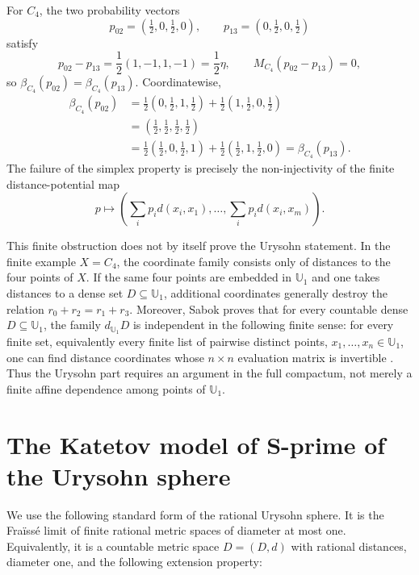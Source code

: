 \documentclass{proc-l}
\numberwithin{equation}{section}
\theoremstyle{definition}
\theoremstyle{remark}
\begin{document}
For \(C_4\), the two probability vectors
\[
        p_{02}=\left(\tfrac12,0,\tfrac12,0\right),
        \qquad
        p_{13}=\left(0,\tfrac12,0,\tfrac12\right)
\]
satisfy
\[
        p_{02}-p_{13}=\frac12(1,-1,1,-1)=\frac12\eta,
        \qquad
        M_{C_4}(p_{02}-p_{13})=0,
\]
so \(\beta_{C_4}(p_{02})=\beta_{C_4}(p_{13})\).  Coordinatewise,
\[
\begin{aligned}
        \beta_{C_4}(p_{02})
        &=\frac12(0,\tfrac12,1,\tfrac12)+\frac12(1,\tfrac12,0,\tfrac12)\\
        &=(\tfrac12,\tfrac12,\tfrac12,\tfrac12)\\
        &=\frac12(\tfrac12,0,\tfrac12,1)+\frac12(\tfrac12,1,\tfrac12,0)
        =\beta_{C_4}(p_{13}).
\end{aligned}
\]
The failure of the simplex property is precisely the non-injectivity of the
finite distance-potential map
\[
        p\longmapsto\left(\sum_i p_i d(x_i,x_1),\ldots,
        \sum_i p_i d(x_i,x_m)\right).
\]

This finite obstruction does not by itself prove the Urysohn statement.  In
the finite example \(X=C_4\), the coordinate family consists only of distances
to the four points of \(X\).  If the same four points are embedded in
\(\mathbb U_1\) and one takes distances to a dense set
\(D\subseteq\mathbb U_1\), additional coordinates generally destroy the
relation \(r_0+r_2=r_1+r_3\).  Moreover, Sabok proves that for every countable
dense \(D\subseteq\mathbb U_1\), the family \(d_{\mathbb U_1}D\) is independent
in the following finite sense: for every finite set, equivalently every finite
list of pairwise distinct points,
\(x_1,\ldots,x_n\in\mathbb U_1\), one can find distance coordinates whose
\(n\times n\) evaluation matrix is invertible \cite[Proposition 5.15]{Sabok2016}.
Thus the Urysohn part requires an argument in the full compactum, not merely a
finite affine dependence among points of \(\mathbb U_1\).

\section[The Katetov model of S-prime of the Urysohn sphere]{The Katetov model of S-prime of the Urysohn sphere}
\label{sec:urysohn-model}

We use the following standard form of the rational Urysohn sphere.  It is the
Fra\"iss\'e limit of finite rational metric spaces of diameter at most one.
Equivalently, it is a countable metric space \(D=(D,d)\) with rational
distances, diameter one, and the following extension property:
\end{document}
